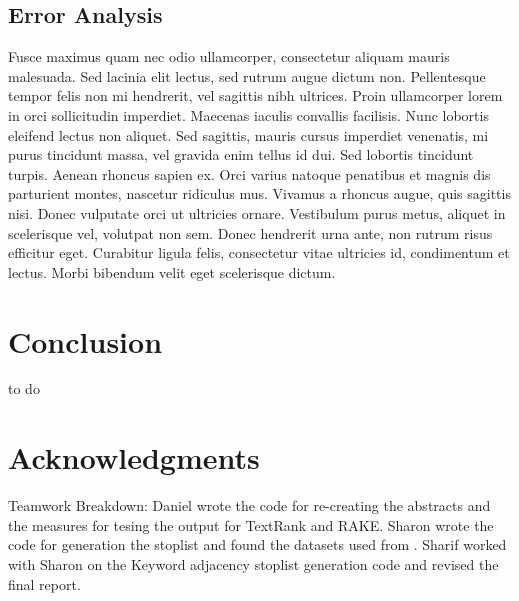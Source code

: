 \documentclass[11pt,a4paper]{article}
\begin{document}
\subsection{Error Analysis}
Fusce maximus quam nec odio ullamcorper, consectetur aliquam mauris malesuada. Sed lacinia elit lectus, sed rutrum augue dictum non. Pellentesque tempor felis non mi hendrerit, vel sagittis nibh ultrices. Proin ullamcorper lorem in orci sollicitudin imperdiet. Maecenas iaculis convallis facilisis. Nunc lobortis eleifend lectus non aliquet. Sed sagittis, mauris cursus imperdiet venenatis, mi purus tincidunt massa, vel gravida enim tellus id dui. Sed lobortis tincidunt turpis. Aenean rhoncus sapien ex. Orci varius natoque penatibus et magnis dis parturient montes, nascetur ridiculus mus. Vivamus a rhoncus augue, quis sagittis nisi. Donec vulputate orci ut ultricies ornare. Vestibulum purus metus, aliquet in scelerisque vel, volutpat non sem. Donec hendrerit urna ante, non rutrum risus efficitur eget. Curabitur ligula felis, consectetur vitae ultricies id, condimentum et lectus. Morbi bibendum velit eget scelerisque dictum.

\section{Conclusion}

to do 

\section{Acknowledgments}

Teamwork Breakdown: Daniel wrote the code for re-creating the abstracts and the measures for tesing the output for TextRank and RAKE. Sharon wrote the code for generation the stoplist and found the datasets used from \citet{hulth-2003-improved}. Sharif worked with Sharon on the Keyword adjacency stoplist generation code and revised the final report. 
 

%
%




\end{document}
